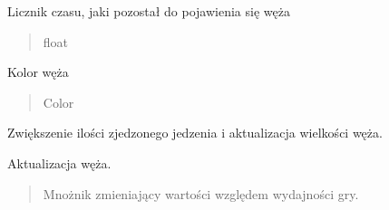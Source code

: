 \documentclass[letterpaper,10pt,polish]{sphinxmanual}
\begin{document}
\begin{fulllineitems}
\begin{fulllineitems}
\end{fulllineitems}


\begin{fulllineitems}
\label{\detokenize{snake:snake.Snake.spawn_timer}}
\pysigstartsignatures
{}
\pysigstopsignatures
\sphinxAtStartPar
Licznik czasu, jaki pozostał do pojawienia się węża
\begin{quote}\begin{description}
\sphinxAtStartPar
float

\end{description}\end{quote}

\end{fulllineitems}


\begin{fulllineitems}
\label{\detokenize{snake:snake.Snake.color}}
\pysigstartsignatures
{}
\pysigstopsignatures
\sphinxAtStartPar
Kolor węża
\begin{quote}\begin{description}
\sphinxAtStartPar
Color

\end{description}\end{quote}

\end{fulllineitems}


\begin{fulllineitems}
\label{\detokenize{snake:snake.Snake.grow}}
\pysigstartsignatures
{}
\pysigstopsignatures
\sphinxAtStartPar
Zwiększenie ilości zjedzonego jedzenia i aktualizacja wielkości węża.

\end{fulllineitems}


\begin{fulllineitems}
\label{\detokenize{snake:snake.Snake.update_snake}}
\pysigstartsignatures
{}
\pysigstopsignatures
\sphinxAtStartPar
Aktualizacja węża.
\begin{quote}\begin{description}
\sphinxAtStartPar
{} \textendash{} Mnożnik zmieniający wartości względem wydajności gry.


\end{description}
\end{quote}
\end{fulllineitems}
\end{fulllineitems}
\end{document}
